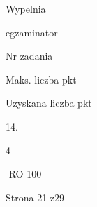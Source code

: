 \documentclass[a4paper,12pt]{article}
\begin{document}
Wypelnia

egzaminator

Nr zadania

Maks. liczba pkt

Uzyskana liczba pkt

14.

4

-RO-100

Strona 21 z29
\end{document}
